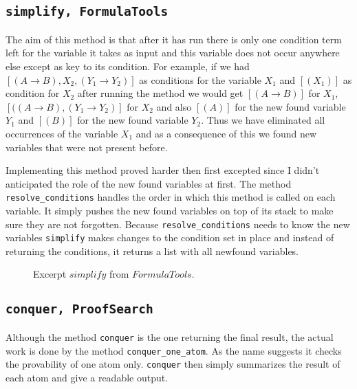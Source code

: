 \subsection[simplify]{\texttt{simplify, FormulaTools}}

The aim of this method is that after it has run there is only one condition term left for the variable it takes as input and this variable does not occur anywhere else except as key to its condition. For example, if we had $ [(A \rightarrow B), X_2, (Y_1 \rightarrow Y_2)]$ as conditions for the variable $X_1$ and $[(X_1)]$ as condition for $X_2$ after running the method we would get $[(A \rightarrow B)]$ for $X_1$, $[((A \rightarrow B), (Y_1 \rightarrow Y_2)]$ for $X_2$ and also $[(A)]$ for the new found variable $Y_1$ and $[(B)]$ for the new found variable $Y_2$. Thus we have eliminated all occurrences of the variable $X_1$ and as a consequence of this we found new variables that were not present before. 

Implementing this method proved harder then first excepted since I didn't anticipated the role of the new found variables at first. The method \texttt{resolve\_conditions} handles the order in which this method is called on each variable. It simply pushes the new found variables on top of its stack to make sure they are not forgotten. Because \texttt{resolve\_conditions} needs to know the new variables \texttt{simplify} makes changes to the condition set in place and instead of returning the conditions, it returns a list with all newfound variables.

\begin{figure}[H]
	\vspace{-10pt}
	
	\vspace{-10pt}
	\caption{Excerpt $simplify$ from $FormulaTools$.}
	\vspace{-10pt}
\end{figure}


\subsection[conquer]{\texttt{conquer, ProofSearch}}
Although the method \texttt{conquer} is the one returning the final result, the actual work is done by the method \texttt{conquer\_one\_atom}. As the name suggests it checks the provability of one atom only. \texttt{conquer} then simply summarizes the result of each atom and give a readable output.

